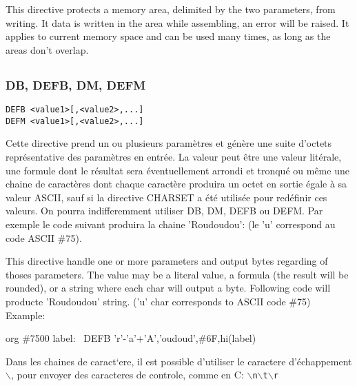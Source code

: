 \begin{xen}
This directive protects a memory area, delimited by the two parameters, from writing. It data is written in the area while assembling, an error will be raised.
It applies to current memory space and can be used many times, as long as the areas don't overlap.
\end{xen}

\subsection{}

\subsubsection{DB, DEFB, DM, DEFM}

\begin{verbatim}
DEFB <value1>[,<value2>,...]
DEFM <value1>[,<value2>,...]
\end{verbatim}

\begin{xfr}
Cette directive prend un ou plusieurs paramètres et génère une suite d'octets représentative des paramètres en entrée. La valeur peut être une valeur litérale, une formule dont le résultat sera éventuellement arrondi et tronqué ou même une chaine de caractères dont chaque caractère produira un octet en sortie égale à sa valeur ASCII, sauf si la directive CHARSET a été utilisée pour redéfinir ces valeurs. On pourra indifferemment utiliser DB, DM, DEFB ou DEFM.
Par exemple le code suivant produira la chaine 'Roudoudou': (le 'u' correspond au code ASCII \#75).
\end{xfr}

\begin{xen}
This directive handle one or more parameters and output bytes regarding of thoses parameters. The value may be a literal value, a formula (the result will be rounded), or a string where each char will output a byte.
Following code will producte 'Roudoudou' string. ('u' char corresponds to ASCII code \#75)
Example:
\end{xen}

\begin{code}
org \#7500
label:
\ DEFB 'r'-'a'+'A','oudoud',\#6F,hi(label)
\end{code}

\begin{xfr}
Dans les chaines de caract`ere, il est possible d'utiliser le caractere d'échappement $\backslash$, pour envoyer des caracteres de controle, comme en C: \texttt{$\backslash$n$\backslash$t$\backslash$r}
\end{xfr}

